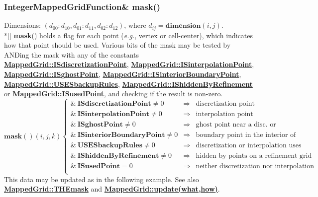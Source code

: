 \documentclass{article}
\begin{document}
  \subsubsection{IntegerMappedGridFunction\& mask()}
  \label{MappedGrid::mask()}
    Dimensions: $(d_{00}\colon d_{10},d_{01}\colon d_{11},d_{02}\colon d_{12})$, where $d_{ij} = \textbf{dimension}(i,j)$. \\*[\parskip]
    \textbf{mask}() holds a flag for each point ({\sl{}e.g.}, vertex or cell-center), which indicates how that point should be used.
    Various bits of the mask may be tested by ANDing the mask with any of the constants
    {\bf{}\hyperref{ISdiscretizationPoint}{ISdiscretizationPoint \rm(\S}{)}{MappedGrid::ISdiscretizationPoint}},
    {\bf{}\hyperref{ISinterpolationPoint}{ISinterpolationPoint \rm(\S}{)}{MappedGrid::ISinterpolationPoint}},
    {\bf{}\hyperref{ISghostPoint}{ISghostPoint \rm(\S}{)}{MappedGrid::ISghostPoint}},
    {\bf{}\hyperref{ISinteriorBoundaryPoint}{ISinteriorBoundaryPoint \rm(\S}{)}{MappedGrid::ISinteriorBoundaryPoint}},
    {\bf{}\hyperref{USESbackupRules}{USESbackupRules \rm(\S}{)}{MappedGrid::USESbackupRules}},
    {\bf{}\hyperref{IShiddenByRefinement}{IShiddenByRefinement \rm(\S}{)}{MappedGrid::IShiddenByRefinement}} or
    {\bf{}\hyperref{ISusedPoint}{ISusedPoint \rm(\S}{)}{MappedGrid::ISusedPoint}}, and checking if the result is non-zero.
    \[ \textbf{mask}()(i,j,k) \left\{ \begin{array}{lll}
      \&\ \textbf{ISdiscretizationPoint}   \ne 0 & \Rightarrow & \mbox{discretization point}                                 \\
      \&\ \textbf{ISinterpolationPoint}    \ne 0 & \Rightarrow & \mbox{interpolation point}                                  \\
      \&\ \textbf{ISghostPoint}            \ne 0 & \Rightarrow & \mbox{ghost point near a disc.\ or interp.~boundary point.} \\
      \&\ \textbf{ISinteriorBoundaryPoint} \ne 0 & \Rightarrow & \mbox{boundary point in the interior of another grid}       \\
      \&\ \textbf{USESbackupRules}         \ne 0 & \Rightarrow & \mbox{discretization or interpolation uses backup rules}    \\
      \&\ \textbf{IShiddenByRefinement}    \ne 0 & \Rightarrow & \mbox{hidden by points on a refinement grid}                \\
      \&\ \textbf{ISusedPoint}              =  0 & \Rightarrow & \mbox{neither discretization nor interpolation point}       \\
    \end{array} \right. \]
    This data may be updated as in the following example.
    See also {\bf{}\hyperref{THEmask}{THEmask \rm(\S}{)}{MappedGrid::THEmask}} and
    {\bf{}\hyperref{update(what,how)}{update(what,how) \rm(\S}{)}{MappedGrid::update(what,how)}}.
\end{document}
